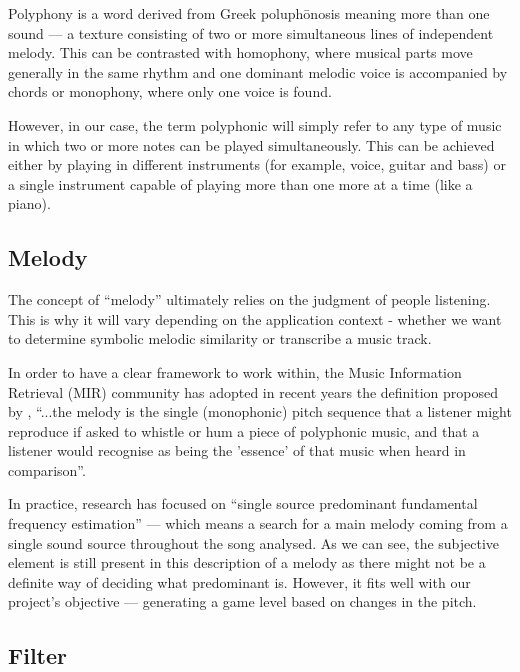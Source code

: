 Polyphony is a word derived from Greek poluph\={o}nosis meaning more than one sound — a texture consisting of two or more simultaneous lines of independent melody. This can be contrasted with homophony, where musical parts move generally in the same rhythm and one dominant melodic voice is accompanied by chords or monophony, where only one voice is found. 

However, in our case, the term polyphonic will simply refer to any type of music in which two or more notes can be played simultaneously. This can be achieved either by playing in different instruments (for example, voice, guitar and bass) or a single instrument capable of playing more than one more at a time (like a piano).

\vspace{10pt}

\subsection{Melody}

The concept of “melody” ultimately relies on the judgment of people listening. This is why it will vary depending on the application context - whether we want to determine symbolic melodic similarity or transcribe a music track. 

In order to have a clear framework to work within, the Music Information Retrieval (MIR) community has adopted in recent years the definition proposed by \cite{melodydef}, ``...the melody is the single (monophonic) pitch sequence that a listener might reproduce if asked to whistle or hum a piece of polyphonic music, and that a listener would recognise as being the 'essence' of that music when heard in comparison''.

In practice, research has focused on ``single source predominant fundamental frequency estimation'' — which means a search for a main melody coming from a single sound source throughout the song analysed. As we can see, the subjective element is still present in this description of a melody as there might not be a definite way of deciding what predominant is. However, it fits well with our project’s objective — generating a game level based on changes in the pitch.

\vspace{10pt}

\subsection{Filter}

